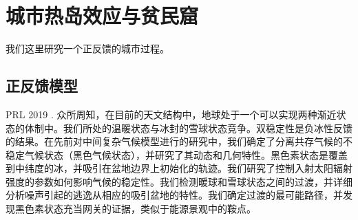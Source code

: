 \chapter{城市热岛效应与贫民窟}

我们这里研究一个正反馈的城市过程。

\section{正反馈模型}

PRL 2019 \cite{PhysRevLett.122.158701}. 众所周知，在目前的天文结构中，地球处于一个可以实现两种渐近状态的体制中。我们所处的温暖状态与冰封的雪球状态竞争。双稳定性是负冰性反馈的结果。在先前对中间复杂气候模型进行的研究中，我们确定了分离共存气候的不稳定气候状态（黑色气候状态），并研究了其动态和几何特性。黑色素状态是覆盖到中纬度的冰，并吸引在盆地边界上初始化的轨迹。我们研究了控制入射太阳辐射强度的参数如何影响气候的稳定性。我们检测暖球和雪球状态之间的过渡，并详细分析噪声引起的逃逸从相应的吸引盆地的特性。我们确定过渡的最可能路径，并发现黑色素状态充当网关的证据，类似于能源景观中的鞍点。
